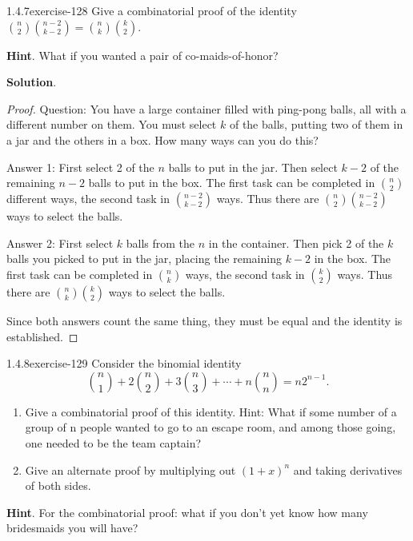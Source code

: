 \documentclass[twoside,11pt,]{book}
\numberwithin{equation}{chapter}
\begin{document}
\begin{divisionsolution}{1.4.7}{}{exercise-128}%
\hypertarget{p-2115}{}%
Give a combinatorial proof of the identity \({n \choose 2}{n-2 \choose k-2} = {n\choose k}{k \choose 2}\).%
\par\smallskip%
\noindent\textbf{Hint}.\quad%
\hypertarget{p-2116}{}%
What if you wanted a pair of co-maids-of-honor?%
\par\smallskip%
\noindent\textbf{Solution}.\quad%
\begin{proof}{}
\hypertarget{p-2117}{}%
Question: You have a large container filled with ping-pong balls, all with a different number on them. You must select \(k\) of the balls, putting two of them in a jar and the others in a box. How many ways can you do this?%
\par
\hypertarget{p-2118}{}%
Answer 1: First select 2 of the \(n\) balls to put in the jar. Then select \(k-2\) of the remaining \(n-2\) balls to put in the box. The first task can be completed in \({n \choose 2}\) different ways, the second task in \({n-2 \choose k-2}\) ways. Thus there are \({n \choose 2}{n-2 \choose k-2}\) ways to select the balls.%
\par
\hypertarget{p-2119}{}%
Answer 2: First select \(k\) balls from the \(n\) in the container. Then pick 2 of the \(k\) balls you picked to put in the jar, placing the remaining \(k-2\) in the box. The first task can be completed in \({n \choose k}\) ways, the second task in \({k \choose 2}\) ways. Thus there are \({n \choose k}{k \choose 2}\) ways to select the balls.%
\par
\hypertarget{p-2120}{}%
Since both answers count the same thing, they must be equal and the identity is established.%
\end{proof}
\end{divisionsolution}%
\begin{divisionsolution}{1.4.8}{}{exercise-129}%
\hypertarget{p-2121}{}%
Consider the binomial identity%
\begin{equation*}
\binom{n}{1} + 2 \binom{n}{2} + 3 \binom{n}{3} + \cdots + n\binom{n}{n} = n2^{n-1}\text{.}
\end{equation*}
\leavevmode%
\begin{enumerate}[label=(\alph*)]
\item\hypertarget{li-1325}{}\hypertarget{p-2122}{}%
Give a combinatorial proof of this identity.  Hint: What if some number of a group of \textdollar{}n\textdollar{} people wanted to go to an escape room, and among those going, one needed to be the team captain?%
\item\hypertarget{li-1326}{}\hypertarget{p-2123}{}%
Give an alternate proof by multiplying out \((1+x)^n\) and taking derivatives of both sides.%
\end{enumerate}
%
\par\smallskip%
\noindent\textbf{Hint}.\quad%
\hypertarget{p-2124}{}%
For the combinatorial proof: what if you don't yet know how many bridesmaids you will have?%
\end{divisionsolution}%
\end{document}
